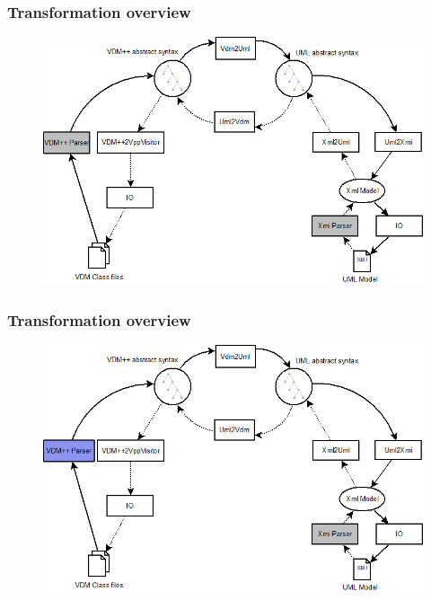 %
%
\frame
{
  \frametitle{Transformation overview}
\begin{center}
\begin{figure}
\includegraphics[width=\textwidth]{images/OverviewOverMapping.png}
\end{figure}
\end{center}
}

%
%
\frame
{
  \frametitle{Transformation overview}
\begin{center}
\begin{figure}
\includegraphics[width=\textwidth]{images/OverviewOverMappingToVDM1.png}
\end{figure}
\end{center}
}

